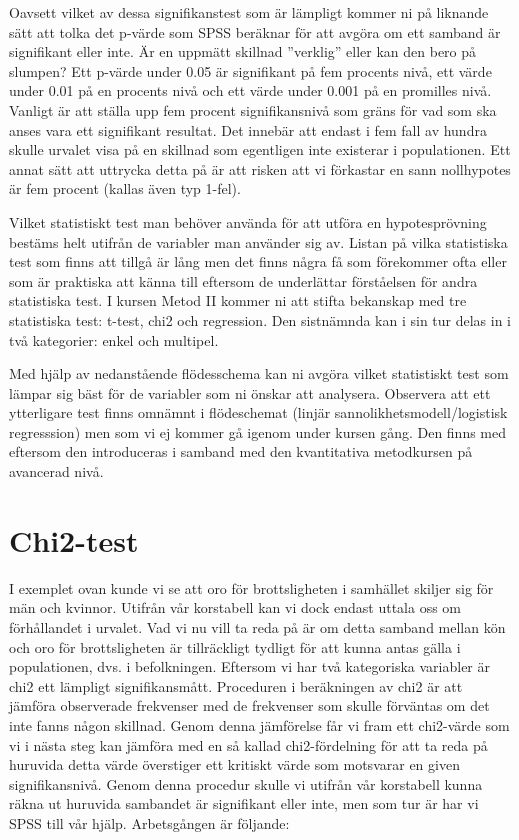 \documentclass[
]{book}
\begin{document}
Oavsett vilket av dessa signifikanstest som är lämpligt kommer ni på liknande sätt att tolka det p-värde
som SPSS beräknar för att avgöra om ett samband är signifikant eller inte. Är en uppmätt skillnad
''verklig'' eller kan den bero på slumpen? Ett p-värde under 0.05 är signifikant på fem procents nivå, ett
värde under 0.01 på en procents nivå och ett värde under 0.001 på en promilles nivå. Vanligt är att
ställa upp fem procent signifikansnivå som gräns för vad som ska anses vara ett signifikant resultat. Det
innebär att endast i fem fall av hundra skulle urvalet visa på en skillnad som egentligen inte existerar i
populationen. Ett annat sätt att uttrycka detta på är att risken att vi förkastar en sann nollhypotes är
fem procent (kallas även typ 1-fel).

Vilket statistiskt test man behöver använda för att utföra en hypotesprövning bestäms helt utifrån de variabler man använder sig av.
Listan på vilka statistiska test som finns att tillgå är lång men det finns några få som förekommer ofta eller som är praktiska att känna till
eftersom de underlättar förståelsen för andra statistiska test. I kursen Metod II kommer ni att stifta bekanskap med tre statistiska test:
t-test, chi2 och regression. Den sistnämnda kan i sin tur delas in i två kategorier: enkel och multipel.

Med hjälp av nedanstående flödesschema kan ni avgöra vilket statistiskt test som lämpar sig bäst för de variabler som ni önskar att analysera. Observera att ett ytterligare
test finns omnämnt i flödeschemat (linjär sannolikhetsmodell/logistisk regresssion) men som vi ej kommer gå igenom under kursen gång.
Den finns med eftersom den introduceras i samband med den kvantitativa metodkursen på avancerad nivå.

\hypertarget{chi2-test}{%
\chapter{Chi2-test}\label{chi2-test}}

I exemplet ovan kunde vi se att oro för brottsligheten i samhället skiljer sig för män och kvinnor. Utifrån
vår korstabell kan vi dock endast uttala oss om förhållandet i urvalet. Vad vi nu vill ta reda på är om detta
samband mellan kön och oro för brottsligheten är tillräckligt tydligt för att kunna antas gälla i
populationen, dvs. i befolkningen. Eftersom vi har två kategoriska variabler är chi2 ett lämpligt
signifikansmått. Proceduren i beräkningen av chi2 är att jämföra observerade frekvenser med de
frekvenser som skulle förväntas om det inte fanns någon skillnad. Genom denna jämförelse får vi fram
ett chi2-värde som vi i nästa steg kan jämföra med en så kallad chi2-fördelning för att ta reda på
huruvida detta värde överstiger ett kritiskt värde som motsvarar en given signifikansnivå. Genom denna
procedur skulle vi utifrån vår korstabell kunna räkna ut huruvida sambandet är signifikant eller inte,
men som tur är har vi SPSS till vår hjälp. Arbetsgången är följande:
\end{document}
